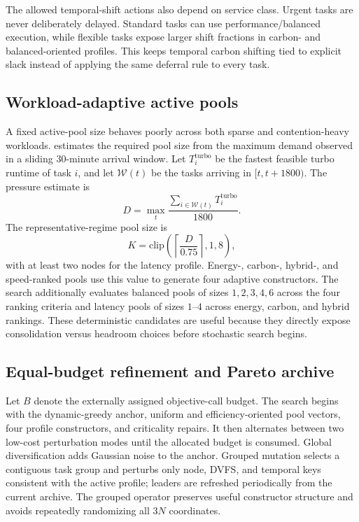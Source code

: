 The allowed temporal-shift actions also depend on service class. Urgent tasks are never deliberately delayed. Standard tasks can use performance/balanced execution, while flexible tasks expose larger shift fractions in carbon- and balanced-oriented profiles. This keeps temporal carbon shifting tied to explicit slack instead of applying the same deferral rule to every task.

\subsection{Workload-adaptive active pools}

A fixed active-pool size behaves poorly across both sparse and contention-heavy workloads. \method estimates the required pool size from the maximum demand observed in a sliding 30-minute arrival window. Let $T_i^{\mathrm{turbo}}$ be the fastest feasible turbo runtime of task $i$, and let $\mathcal{W}(t)$ be the tasks arriving in $[t,t+1800)$. The pressure estimate is
\begin{equation}
D=\max_t\frac{\sum_{i\in\mathcal{W}(t)}T_i^{\mathrm{turbo}}}{1800}.
\end{equation}
The representative-regime pool size is
\begin{equation}
K=\mathrm{clip}\left(\left\lceil\frac{D}{0.75}\right\rceil,1,8\right),
\label{eq:pool-size}
\end{equation}
with at least two nodes for the latency profile. Energy-, carbon-, hybrid-, and speed-ranked pools use this value to generate four adaptive constructors. The search additionally evaluates balanced pools of sizes $1,2,3,4,6$ across the four ranking criteria and latency pools of sizes $1$--$4$ across energy, carbon, and hybrid rankings. These deterministic candidates are useful because they directly expose consolidation versus headroom choices before stochastic search begins.

\subsection{Equal-budget refinement and Pareto archive}

Let $B$ denote the externally assigned objective-call budget. The search begins with the dynamic-greedy anchor, uniform and efficiency-oriented pool vectors, four profile constructors, and criticality repairs. It then alternates between two low-cost perturbation modes until the allocated budget is consumed. Global diversification adds Gaussian noise to the anchor. Grouped mutation selects a contiguous task group and perturbs only node, DVFS, and temporal keys consistent with the active profile; leaders are refreshed periodically from the current archive. The grouped operator preserves useful constructor structure and avoids repeatedly randomizing all $3N$ coordinates.

